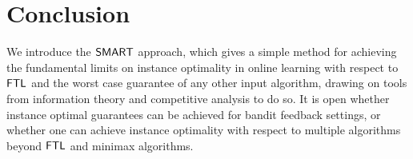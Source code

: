 \section{Conclusion} \label{sec:conclusion}

We introduce the $\mathsf{SMART}$ approach, which gives a simple method for achieving the fundamental limits on instance optimality in online learning with respect to $\mathsf{FTL}$ and the worst case guarantee of any other input algorithm, drawing on tools from information theory and competitive analysis to do so. It is open whether instance optimal guarantees can be achieved for bandit feedback settings, or whether one can achieve instance optimality with respect to multiple algorithms beyond $\mathsf{FTL}$ and minimax algorithms. 